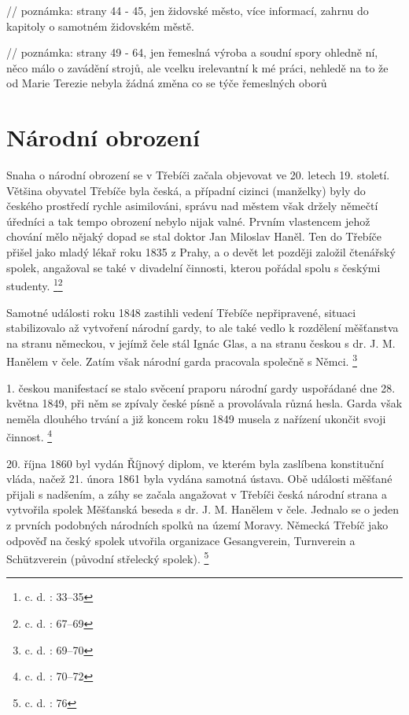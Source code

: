 \documentclass[a4paper,oneside,12p]{report}
\begin{document}
// poznámka: strany 44 - 45, jen židovské město, více informací, zahrnu do kapitoly o samotném židovském městě.


// poznámka: strany 49 - 64, jen řemeslná výroba a soudní spory ohledně ní, něco málo o zavádění strojů, ale vcelku irelevantní k mé práci, nehledě na to že od Marie Terezie nebyla žádná změna co se týče řemeslných oborů

\section{Národní obrození}

Snaha o národní obrození se v Třebíči začala objevovat ve 20. letech 19. století.
Většina obyvatel Třebíče byla česká, a případní cizinci (manželky) byly do českého prostředí rychle asimilováni, správu nad městem však držely němečtí úředníci a tak tempo obrození nebylo nijak valné.
Prvním vlastencem jehož chování mělo nějaký dopad se stal doktor Jan Miloslav Haněl.
Ten do Třebíče přišel jako mladý lékař roku 1835 z Prahy, a o devět let později založil čtenářský spolek, angažoval se také v divadelní činnosti, kterou pořádal spolu s českými studenty. \footnote{c. d. : 33--35}\footnote{c. d. : 67--69}

Samotné události roku 1848 zastihli vedení Třebíče nepřipravené, situaci stabilizovalo až vytvoření národní gardy, to ale také vedlo k rozdělení měšťanstva na stranu německou, v jejímž čele stál Ignác Glas, a na stranu českou s dr. J. M. Hanělem v čele.
Zatím však národní garda pracovala společně s Němci. \footnote{c. d. : 69--70}

1. českou manifestací se stalo svěcení praporu národní gardy uspořádané dne 28. května 1849, při něm se zpívaly české písně a provolávala různá hesla.
Garda však neměla dlouhého trvání a již koncem roku 1849 musela z nařízení ukončit svoji činnost. \footnote{c. d. : 70--72}

20. října 1860 byl vydán Říjnový diplom, ve kterém byla zaslíbena konstituční vláda, načež 21. února 1861 byla vydána samotná ústava.
Obě události měšťané přijali s nadšením, a záhy se začala angažovat v Třebíči česká národní strana a vytvořila spolek Měšťanská beseda s dr. J. M. Hanělem v čele.
Jednalo se o jeden z prvních podobných národních spolků na území Moravy.
Německá Třebíč jako odpověď na český spolek utvořila organizace Gesangverein, Turnverein a Schützverein (původní střelecký spolek). \footnote{c. d. : 76}
\end{document}
